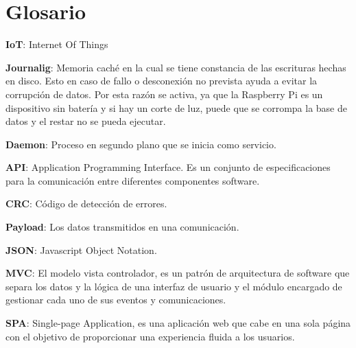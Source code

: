 \chapter*{Glosario}

{\bf IoT}: Internet Of Things

{\bf Journalig}: Memoria caché en la cual se tiene constancia de las escrituras hechas en disco. Esto en caso de fallo o desconexión no prevista ayuda a evitar la corrupción de datos. Por esta razón se activa, ya que la Raspberry Pi es un dispositivo sin batería y si hay un corte de luz, puede que se corrompa la base de datos y el restar no se pueda ejecutar. 

{\bf Daemon}: Proceso en segundo plano que se inicia como servicio.

{\bf API}: Application Programming Interface. Es un conjunto de especificaciones
para la comunicación entre diferentes componentes software.

{\bf CRC}: Código de detección de errores.

{\bf Payload}: Los datos transmitidos en una comunicación.

{\bf JSON}: Javascript Object Notation.

{\bf MVC}: El modelo vista controlador, es un patrón de arquitectura de software que separa los
datos y la lógica de una interfaz de usuario y el módulo encargado de gestionar cada uno de sus
eventos y comunicaciones.

{\bf SPA}: Single-page Application, es una aplicación web que cabe en una sola página con el
objetivo de proporcionar una experiencia fluida a los usuarios.

